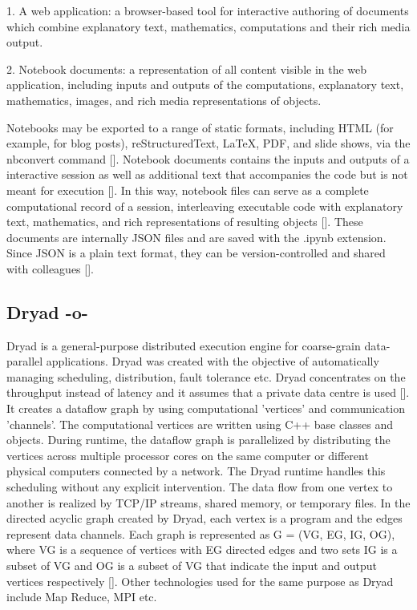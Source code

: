 1. A web application: a browser-based tool for interactive authoring
of documents which combine explanatory text, mathematics, computations
and their rich media output.

2. Notebook documents: a representation of all content visible in the
web application, including inputs and outputs of the computations,
explanatory text, mathematics, images, and rich media representations
of objects.

Notebooks may be exported to a range of static formats, including HTML
(for example, for blog posts), reStructuredText, LaTeX, PDF, and slide
shows, via the nbconvert command [\cite{www-jupyter-3}].  Notebook
documents contains the inputs and outputs of a interactive session as
well as additional text that accompanies the code but is not meant for
execution [\cite{www-jupyter-4}]. In this way, notebook files can
serve as a complete computational record of a session, interleaving
executable code with explanatory text, mathematics, and rich
representations of resulting objects [\cite{www-jupyter-5}]. These
documents are internally JSON files and are saved with the .ipynb
extension. Since JSON is a plain text format, they can be
version-controlled and shared with colleagues [\cite{www-jupyter-6}].

\subsection{Dryad -o-}

Dryad is a general-purpose distributed execution engine for
coarse-grain data-parallel applications. Dryad was created with the
objective of automatically managing scheduling, distribution, fault
tolerance etc. Dryad concentrates on the throughput instead of latency
and it assumes that a private data centre is
used [\cite{www-DryadIntro}].  It creates a dataflow graph by using
computational 'vertices' and communication 'channels'. The
computational vertices are written using C++ base classes and
objects. During runtime, the dataflow graph is parallelized by
distributing the vertices across multiple processor cores on the same
computer or different physical computers connected by a network. The
Dryad runtime handles this scheduling without any explicit
intervention. The data flow from one vertex to another is realized by
TCP/IP streams, shared memory, or temporary files. In the directed
acyclic graph created by Dryad, each vertex is a program and the edges
represent data channels. Each graph is represented as G = (VG, EG, IG,
OG), where VG is a sequence of vertices with EG directed edges and two
sets IG is a subset of VG and OG is a subset of VG that indicate the
input and output vertices respectively [\cite{DryadPaper}]. Other
technologies used for the same purpose as Dryad include Map Reduce,
MPI etc.

